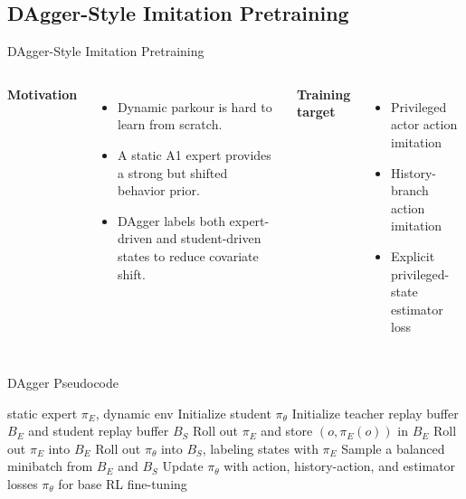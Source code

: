 \documentclass[aspectratio=169,xcolor=dvipsnames]{beamer}
\begin{document}
\subsection{DAgger-Style Imitation Pretraining}

\begin{frame}{DAgger-Style Imitation Pretraining}
    \begin{columns}[T,onlytextwidth]
        \textbf{Motivation}
        \begin{itemize}
            \setlength{\itemsep}{0.35em}
            \item Dynamic parkour is hard to learn from scratch.
            \item A static A1 expert provides a strong but shifted behavior prior.
            \item DAgger labels both expert-driven and student-driven states to reduce covariate shift.
        \end{itemize}

        \textbf{Training target}
        \begin{itemize}
            \setlength{\itemsep}{0.35em}
            \item Privileged actor action imitation
            \item History-branch action imitation
            \item Explicit privileged-state estimator loss
        \end{itemize}
    \end{columns}
\end{frame}

\begin{frame}{DAgger Pseudocode}
    \small
    \begin{algorithmic}[1]
        \Require static expert $\pi_E$, dynamic env
        \State Initialize student $\pi_\theta$
        \State Initialize teacher replay buffer $B_E$ and student replay buffer $B_S$
        \State Roll out $\pi_E$ and store $(o,\pi_E(o))$ in $B_E$
        \Else
        \State Roll out $\pi_E$ into $B_E$
        \State Roll out $\pi_\theta$ into $B_S$, labeling states with $\pi_E$
        \EndIf
        \State Sample a balanced minibatch from $B_E$ and $B_S$
        \State Update $\pi_\theta$ with action, history-action, and estimator losses
        \EndFor
        \State \Return $\pi_\theta$ for base RL fine-tuning
    \end{algorithmic}
\end{frame}
\end{document}
